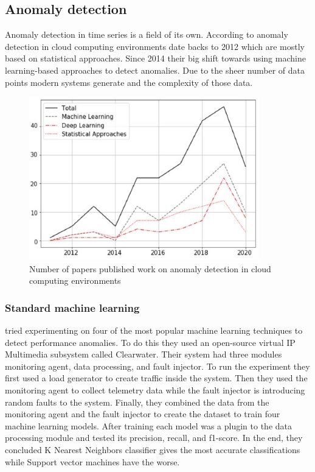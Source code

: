 \subsection{Anomaly detection}


Anomaly detection in time series is a field of its own. According to \cite{hagemann2020systematic} anomaly detection in cloud computing environments date backs to 2012 which are mostly based on statistical approaches. Since 2014 their big shift towards using machine learning-based approaches to detect anomalies. Due to the sheer number of data points modern systems generate and the complexity of those data.

\begin{figure}[H]
    \includegraphics[width=10cm]{assets/literature-review/num-of-anomaly-detection-papers.jpg}
    \caption{Number of papers published work on anomaly detection in cloud computing environments \citep{hagemann2020systematic}}
    \label{fig:num-of-anomaly-detection-paperss}
\end{figure}

\subsubsection{Standard machine learning}

\cite{du2018anomaly} tried experimenting on four of the most popular machine learning techniques to detect performance anomalies. To do this they used an open-source virtual IP Multimedia subsystem called Clearwater. Their system had three modules monitoring agent, data processing, and fault injector. To run the experiment they first used a load generator to create traffic inside the system. Then they used the monitoring agent to collect telemetry data while the fault injector is introducing random faults to the system. Finally, they combined the data from the monitoring agent and the fault injector to create the dataset to train four machine learning models. After training each model was a plugin to the data processing module and tested its precision, recall, and f1-score. In the end, they concluded K Nearest Neighbors classifier gives the most accurate classifications while Support vector machines have the worse.


